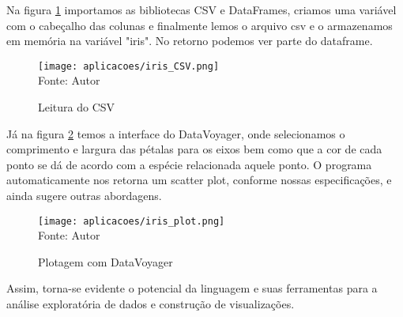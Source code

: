 Na figura \ref{iris_csv} importamos as bibliotecas CSV e DataFrames, criamos uma variável com o cabeçalho das colunas e finalmente lemos o arquivo csv e o armazenamos em memória na variável "iris". No retorno podemos ver parte do dataframe.

\begin{figure}[H]
   \begin{center}
       \caption{Leitura do CSV} \label{iris_csv}
       \texttt{[image: aplicacoes/iris\_CSV.png]} \\
       {\tiny \sf Fonte: Autor}
   \end{center}
\end{figure}

Já na figura \ref{iris_plot} temos a interface do DataVoyager, onde selecionamos o comprimento e largura das pétalas para os eixos bem como que a cor de cada ponto se dá de acordo com a espécie relacionada aquele ponto. O programa automaticamente nos retorna um scatter plot, conforme nossas especificações, e ainda sugere outras abordagens. 


\begin{figure}[H]
   \begin{center}
       \caption{Plotagem com DataVoyager} \label{iris_plot}
       \texttt{[image: aplicacoes/iris\_plot.png]} \\
       {\tiny \sf Fonte: Autor}
   \end{center}
\end{figure}

Assim, torna-se evidente o potencial da linguagem e suas ferramentas para a análise exploratória de dados e construção de visualizações. 



